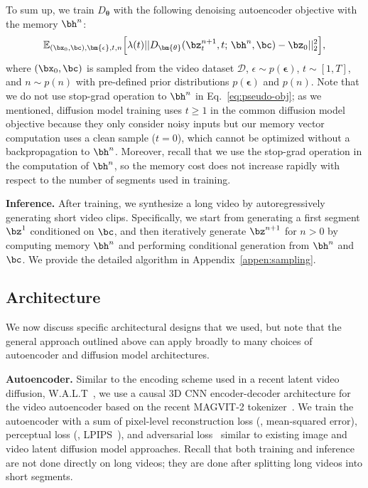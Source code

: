 To sum up, we train $D_{\bm{\theta}}$ with the following denoising autoencoder objective with the memory $\bh^{n}$:
\begin{align}
    \mathbb{E}_{(\bx_0, \bc), \bm{\epsilon}, t, n} 
    \Big[
    \lambda(t)||D_{\bm{\theta}}(\bz_t^{n+1}, t;\, \bh^{n}, \bc) - \bz_0||_2^2 
    \Big],
\label{eq:pseudo-obj}
\end{align}
where $(\bx_0, \bc)$ is sampled from the video dataset $\mathcal{D}$, $\epsilon \sim p(\bm{\epsilon})$, $t \sim [1, T]$, and $n \sim p(n)$ with pre-defined prior distributions $p(\bm{\epsilon})$ and $p(n)$. Note that we do not use stop-grad operation to $\bh^{n}$ in Eq.~\eqref{eq:pseudo-obj}; as we mentioned, diffusion model training uses $t \geq 1$ in the common diffusion model objective because they only consider noisy inputs but our memory vector computation uses a clean sample ($t=0$), which cannot be optimized without a backpropagation to $\bh^{n}$. 
Moreover, recall that we use the stop-grad operation in the computation of $\bh^{n}$, so the memory cost does not increase rapidly with respect to the number of segments used in training.

\textbf{Inference.}
After training, we synthesize a long video by autoregressively generating short video clips. Specifically, we start from generating a first segment $\bz^{1}$ conditioned on $\bc$, and then iteratively generate $\bz^{n+1}$ for $n>0$ by computing memory $\bh^{n}$ and performing conditional generation from $\bh^{n}$ and $\bc$. We provide the detailed algorithm in Appendix~\ref{appen:sampling}.


\subsection{Architecture}
\label{subsec:arch}

We now discuss specific architectural designs that we used, but note that the general approach outlined above can apply broadly to many choices of autoencoder and diffusion model architectures.

\textbf{Autoencoder.}
Similar to the encoding scheme used in a recent latent video diffusion, W.A.L.T~\citep{gupta2023photorealistic}, we use a
causal 3D CNN encoder-decoder architecture for the video autoencoder based on the recent MAGVIT-2 tokenizer~\citep{yu2024language}. We train the autoencoder with a sum of pixel-level reconstruction loss (\eg, mean-squared error), perceptual loss (\eg, LPIPS~\citep{zhang2018perceptual}), and adversarial loss~\citep{goodfellow2014generative} similar to existing image and video latent diffusion model approaches. Recall that both training and inference are not done directly on long videos; they are done after splitting long videos into short segments.

